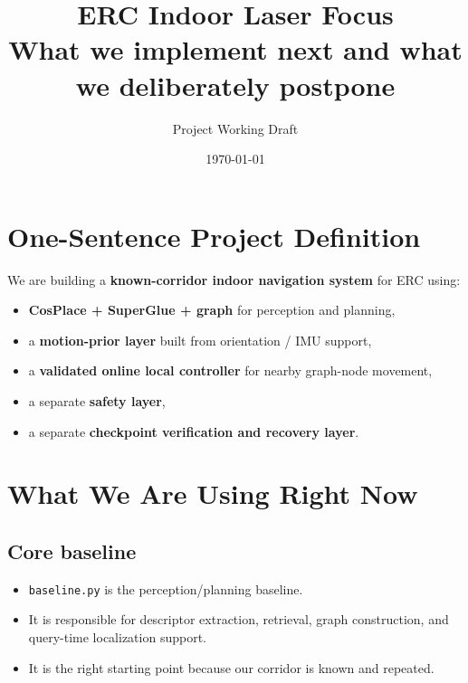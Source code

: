 \documentclass[11pt,a4paper]{article}
\title{ERC Indoor Laser Focus\\[0.3em]
\large What we implement next and what we deliberately postpone}
\author{Project Working Draft}
\date{\today}
\begin{document}
\maketitle
\begin{center}
\end{center}
\vspace{1em}

\section{One-Sentence Project Definition}

We are building a \textbf{known-corridor indoor navigation system} for ERC using:

\begin{itemize}[nosep]
  \item \textbf{CosPlace + SuperGlue + graph} for perception and planning,
  \item a \textbf{motion-prior layer} built from orientation / IMU support,
  \item a \textbf{validated online local controller} for nearby graph-node movement,
  \item a separate \textbf{safety layer},
  \item a separate \textbf{checkpoint verification and recovery layer}.
\end{itemize}


\section{What We Are Using Right Now}

\subsection*{Core baseline}

\begin{itemize}[nosep]
  \item \texttt{baseline.py} is the perception/planning baseline.
  \item It is responsible for descriptor extraction, retrieval, graph construction, and query-time localization support.
  \item It is the right starting point because our corridor is known and repeated.
\end{itemize}
\end{document}
